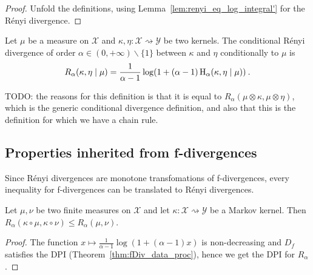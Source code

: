 \begin{proof}\leanok
{}
Unfold the definitions, using Lemma~\ref{lem:renyi_eq_log_integral'} for the Rényi divergence.
\end{proof}

\begin{definition}
  \label{def:condRenyi}
  \leanok
  Let $\mu$ be a measure on $\mathcal X$ and $\kappa, \eta : \mathcal X \rightsquigarrow \mathcal Y$ be two kernels. The conditional Rényi divergence of order $\alpha \in (0,+\infty) \backslash \{1\}$ between $\kappa$ and $\eta$ conditionally to $\mu$ is
  \begin{align*}
  R_\alpha(\kappa, \eta \mid \mu) =\frac{1}{\alpha - 1} \log (1 + (\alpha - 1) \operatorname{H}_\alpha(\kappa, \eta \mid \mu)) \: .
  \end{align*}
\end{definition}

TODO: the reasons for this definition is that it is equal to $R_\alpha(\mu \otimes \kappa, \mu \otimes \eta)$, which is the generic conditional divergence definition, and also that this is the definition for which we have a chain rule.

\subsection{Properties inherited from f-divergences}

Since Rényi divergences are monotone transfomations of f-divergences, every inequality for f-divergences can be translated to Rényi divergences.

\begin{theorem}
  \label{thm:renyi_data_proc}
  \leanok
  Let $\mu, \nu$ be two finite measures on $\mathcal X$ and let $\kappa : \mathcal X \rightsquigarrow \mathcal Y$ be a Markov kernel.
  Then $R_\alpha(\kappa \circ \mu, \kappa \circ \nu) \le R_\alpha(\mu, \nu)$.
\end{theorem}

\begin{proof} \leanok
{}
The function $x \mapsto \frac{1}{\alpha - 1}\log (1 + (\alpha - 1)x)$ is non-decreasing and $D_f$ satisfies the DPI (Theorem~\ref{thm:fDiv_data_proc}), hence we get the DPI for $R_\alpha$.
\end{proof}

